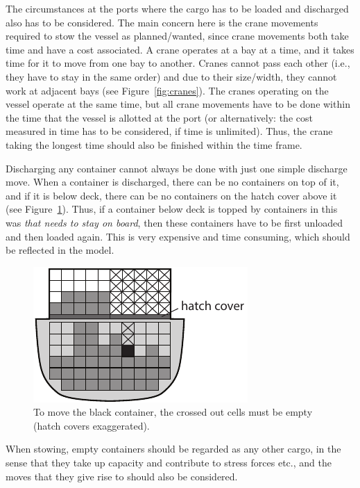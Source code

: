The circumstances at the ports where the cargo has to be loaded and discharged also has to be considered. 
The main concern here is the crane movements required to stow the vessel as planned/wanted, since crane movements both take time and have a cost associated. 
A crane operates at a bay at a time, and it takes time for it to move from one bay to another. Cranes cannot pass each other (i.e., they have to stay in the same order) and due to their size/width, they cannot work at adjacent bays (see Figure~\ref{fig:cranes}). The cranes operating on the vessel operate at the same time, but all crane movements have to be done within the time that the vessel is allotted at the port (or alternatively: the cost measured in time has to be considered, if time is unlimited). Thus, the crane taking the longest time should also be finished within the time frame.

Discharging any container cannot always be done with just one simple discharge move. When a container is discharged, there can be no containers on top of it, and if it is below deck, there can be no containers on the hatch cover above it (see Figure~\ref{fig:overstowA}). Thus, if a container below deck is topped by containers in this was \emph{that needs to stay on board}, then these containers have to be first unloaded and then loaded again. This is very expensive and time consuming, which should be reflected in the model. 

\begin{figure}
	\centering
		\includegraphics{figures/overstow.pdf}
	\caption{To move the black container, the crossed out cells must be empty (hatch covers exaggerated).}
	\label{fig:overstowA}
\end{figure}

When stowing, empty containers should be regarded as any other cargo, in the sense that they take up capacity and contribute to stress forces etc., and the moves that they give rise to should also be considered.    